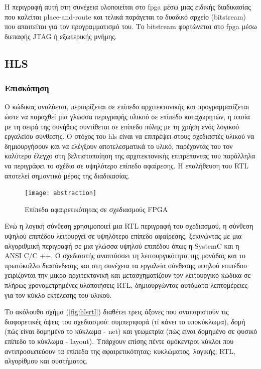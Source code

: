 Η περιγραφή αυτή στη συνέχεια υλοποιείται στο \gls{fpga} μέσω μιας ειδικής διαδικασίας που καλείται place-and-route και τελικά παράγεται το δυαδικό αρχείο (bitstream) που απαιτείται για τον προγραμματισμό του. Το bitstream φορτώνεται στο \gls{fpga} μέσω διεπαφής JTAG ή εξωτερικής μνήμης.
\subsection{HLS}
\subsubsection{Επισκόπηση}

Ο κώδικας αναλύεται, περιορίζεται σε επίπεδο αρχιτεκτονικής και προγραμματίζεται ώστε να παραχθεί μια γλώσσα περιγραφής υλικού σε επίπεδο καταχωρητών, η οποία με τη σειρά της συνήθως συντίθεται σε επίπεδο πύλης με τη χρήση ενός λογικού εργαλείου σύνθεσης. Ο στόχος του \gls{hls} είναι να επιτρέψει στους σχεδιαστές υλικού να δημιουργήσουν και να ελέγξουν αποτελεσματικά το υλικό, παρέχοντάς του τον καλύτερο έλεγχο στη βελτιστοποίηση της αρχιτεκτονικής επιτρέποντας του παράλληλα να περιγράφει το σχέδιο σε υψηλότερο επίπεδο αφαίρεσης. Η επαλήθευση του RTL αποτελεί σημαντικό μέρος της διαδικασίας.
\begin{figure}[H]
  	\centering
	\texttt{[image: abstraction]}
	\caption{Επίπεδα αφαιρετικότητας σε σχεδιασμούς FPGA \cite{Crockett:2014:ZBE:2685817}}
	\label{fig:abstraction}
\end{figure}

Ενώ η λογική σύνθεση χρησιμοποιεί μια RTL περιγραφή του σχεδιασμού, η σύνθεση υψηλού επιπέδου λειτουργεί σε υψηλότερο επίπεδο αφαίρεσης, ξεκινώντας με μια αλγοριθμική περιγραφή σε μια γλώσσα υψηλού επιπέδου όπως η SystemC και η ANSI C/C ++. Ο σχεδιαστής αναπτύσσει τη λειτουργικότητα της μονάδας και το πρωτόκολλο διασύνδεσης και στη συνέχεια τα εργαλεία σύνθεσης υψηλού επιπέδου χειρίζονται την μικρο-αρχιτεκτονική και μετασχηματίζουν τον λειτουργικό κώδικα σε πλήρως χρονομετρημένες υλοποιήσεις RTL, δημιουργώντας αυτόματα λεπτομέρειες για τον κύκλο εκτέλεσης του υλικού.

Το ακόλουθο σχήμα (\ref{fig:hlsrtl}) διαθέτει τρεις άξονες που αναπαριστούν τις διαφορετικές όψεις του σχεδιασμού: συμπεριφορά (τί κάνει το υποκύκλωμα), δομή (πώς είναι δομημένο το κύκλωμα - \gls{net}) και γεωμετρία (πώς είναι δομημένο σε φυσικό επίπεδο το κύκλωμα - layout). Υπάρχουν επίσης πέντε ομόκεντροι κύκλοι που αντιπροσωπεύουν τα επίπεδα της αφαιρετικότητας: κυκλώματος, λογικής, RTL, αλγορίθμου και συστήματος.

